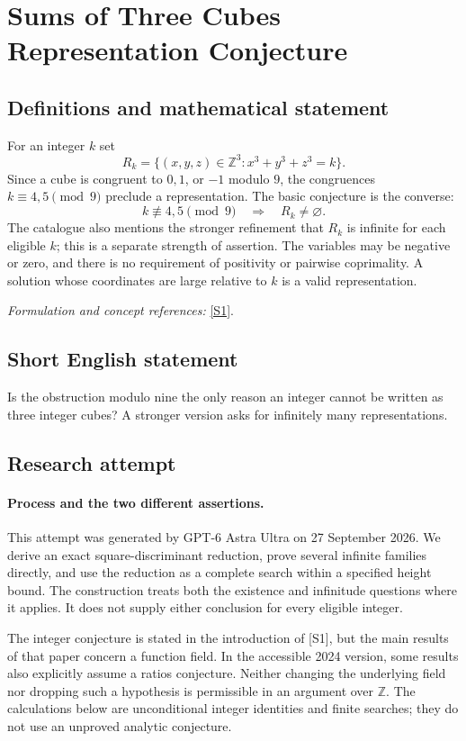 \documentclass[11pt]{article}
\begin{document}
\section*{\texorpdfstring{Sums of Three Cubes Representation Conjecture}{Sums of Three Cubes Representation Conjecture}}\label{statement}
\subsection{Definitions and mathematical statement}
For an integer $k$ set
\[
 R_k=\{(x,y,z)\in{\mathbb{Z}}^3:x^3+y^3+z^3=k\}.
\]
Since a cube is congruent to $0,1$, or $-1$ modulo $9$, the congruences $k\equiv4,5\pmod9$ preclude a representation. The basic conjecture is the converse:
\[
 k\not\equiv4,5\pmod9\quad\Longrightarrow\quad R_k\ne\varnothing.
\]
The catalogue also mentions the stronger refinement that $R_k$ is infinite for each eligible $k$; this is a separate strength of assertion. The variables may be negative or zero, and there is no requirement of positivity or pairwise coprimality. A solution whose coordinates are large relative to $k$ is a valid representation.
\par\smallskip\textit{Formulation and concept references:} \href{https://arxiv.org/pdf/2402.07146}{[S1]}.

\subsection{Short English statement}
Is the obstruction modulo nine the only reason an integer cannot be written as three integer cubes? A stronger version asks for infinitely many representations.
\subsection{Research attempt}
\paragraph{Process and the two different assertions.}
This attempt was generated by GPT-6 Astra Ultra on 27 September 2026. We derive an exact square-discriminant reduction, prove several infinite families directly, and use the reduction as a complete search within a specified height bound. The construction treats both the existence and infinitude questions where it applies. It does not supply either conclusion for every eligible integer.

The integer conjecture is stated in the introduction of [S1], but the main results of that paper concern a function field. In the accessible 2024 version, some results also explicitly assume a ratios conjecture. Neither changing the underlying field nor dropping such a hypothesis is permissible in an argument over $\mathbb Z$. The calculations below are unconditional integer identities and finite searches; they do not use an unproved analytic conjecture.
\end{document}
